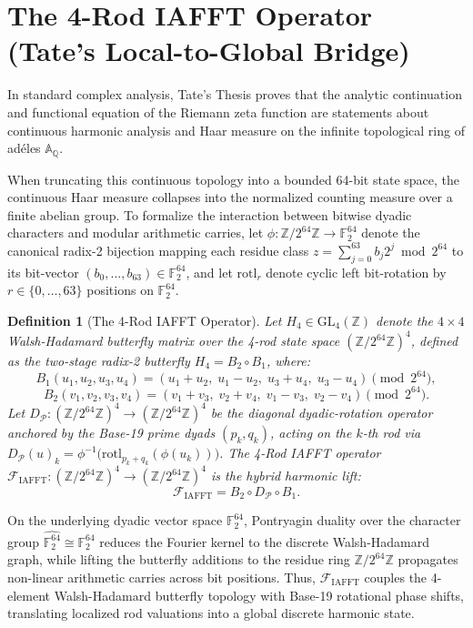 \documentclass[11pt, a4paper]{article}
\newtheorem{definition}[theorem]{Definition}
\begin{document}
\section{The 4-Rod IAFFT Operator (Tate's Local-to-Global Bridge)}

In standard complex analysis, Tate's Thesis proves that the analytic continuation and functional equation of the Riemann zeta function are statements about continuous harmonic analysis and Haar measure on the infinite topological ring of ad\'{e}les $\mathbb{A}_{\mathbb{Q}}$. 

When truncating this continuous topology into a bounded 64-bit state space, the continuous Haar measure collapses into the normalized counting measure over a finite abelian group. To formalize the interaction between bitwise dyadic characters and modular arithmetic carries, let $\phi : \mathbb{Z}/2^{64}\mathbb{Z} \to \mathbb{F}_2^{64}$ denote the canonical radix-2 bijection mapping each residue class $z = \sum_{j=0}^{63} b_j 2^j \bmod 2^{64}$ to its bit-vector $(b_0, \dots, b_{63}) \in \mathbb{F}_2^{64}$, and let $\mathrm{rotl}_r$ denote cyclic left bit-rotation by $r \in \{0, \dots, 63\}$ positions on $\mathbb{F}_2^{64}$.

\begin{definition}[The 4-Rod IAFFT Operator]
Let $H_4 \in \mathrm{GL}_4(\mathbb{Z})$ denote the $4 \times 4$ Walsh-Hadamard butterfly matrix over the 4-rod state space $(\mathbb{Z}/2^{64}\mathbb{Z})^4$, defined as the two-stage radix-2 butterfly $H_4 = B_2 \circ B_1$, where:
\[
B_1(u_1, u_2, u_3, u_4) = (u_1 + u_2,\; u_1 - u_2,\; u_3 + u_4,\; u_3 - u_4) \pmod{2^{64}},
\]
\[
B_2(v_1, v_2, v_3, v_4) = (v_1 + v_3,\; v_2 + v_4,\; v_1 - v_3,\; v_2 - v_4) \pmod{2^{64}}.
\]
Let $D_{\mathcal{P}} : (\mathbb{Z}/2^{64}\mathbb{Z})^4 \to (\mathbb{Z}/2^{64}\mathbb{Z})^4$ be the diagonal dyadic-rotation operator anchored by the Base-19 prime dyads $(p_k, q_k)$, acting on the $k$-th rod via $D_{\mathcal{P}}(u)_k = \phi^{-1}\bigl(\mathrm{rotl}_{p_k + q_k}(\phi(u_k))\bigr)$. The 4-Rod IAFFT operator $\mathcal{F}_{\mathrm{IAFFT}} : (\mathbb{Z}/2^{64}\mathbb{Z})^4 \to (\mathbb{Z}/2^{64}\mathbb{Z})^4$ is the hybrid harmonic lift:
\[
\mathcal{F}_{\mathrm{IAFFT}} = B_2 \circ D_{\mathcal{P}} \circ B_1.
\]
\end{definition}

On the underlying dyadic vector space $\mathbb{F}_2^{64}$, Pontryagin duality over the character group $\widehat{\mathbb{F}_2^{64}} \cong \mathbb{F}_2^{64}$ reduces the Fourier kernel to the discrete Walsh-Hadamard graph, while lifting the butterfly additions to the residue ring $\mathbb{Z}/2^{64}\mathbb{Z}$ propagates non-linear arithmetic carries across bit positions. Thus, $\mathcal{F}_{\mathrm{IAFFT}}$ couples the 4-element Walsh-Hadamard butterfly topology with Base-19 rotational phase shifts, translating localized rod valuations into a global discrete harmonic state.
\end{document}
